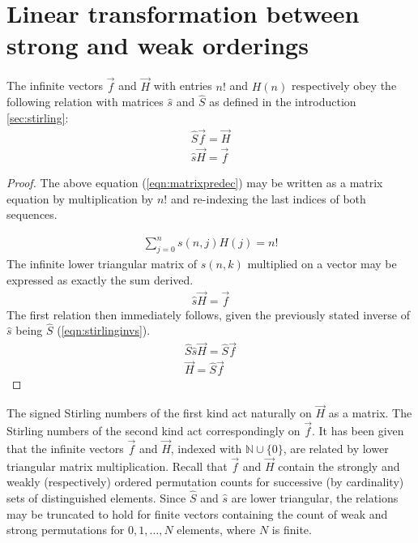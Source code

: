 \documentclass[12pt,reqno]{article}
\begin{document}
\section{Linear transformation between strong and weak orderings}

\begin{corollary}
	The infinite vectors $\vec{f}$ and $\vec{H}$ with entries $n!$ and $H(n)$ respectively obey the following relation with matrices $\hat{s}$ and $\hat{S}$ as defined in the introduction \ref{sec:stirling}:
	\begin{align}
		\hat{S}\vec{f} = \vec{H}\label{eqn:strongstirling} \\
		\hat{s}\vec{H} = \vec{f}
	\end{align}

	\begin{proof}
		The above equation (\ref{eqn:matrixpredec}) may be written as a matrix equation by multiplication by $n!$ and re-indexing the last indices of both sequences.

		\begin{align}
			\sum_{j = 0}^{n} s(n,j) H(j)  = n!
		\end{align}
		The infinite lower triangular matrix of $s(n,k)$ multiplied on a vector may be expressed as exactly the sum derived.
		\begin{align}
			\hat{s}\vec{H} = \vec{f} \nonumber
		\end{align}
		The first relation then immediately follows, given the previously stated inverse of $\hat{s}$ being $\hat{S}$ (\ref{eqn:stirlinginvs}).
		\begin{align}
			\hat{S}\hat{s}\vec{H} = \hat{S} \vec{f} \\
			\vec{H} = \hat{S} \vec{f} \nonumber
		\end{align}
	\end{proof}
\end{corollary}

The signed Stirling numbers of the first kind  act naturally on $\vec{H}$ as a matrix. The Stirling numbers of the second kind act correspondingly on $\vec{f}$. It has been given that the infinite vectors  $\vec{f}$ and $\vec{H}$, indexed with $\mathbb{N} \cup \{0\}$, are related by lower triangular matrix multiplication. Recall that $\vec{f}$ and $\vec{H}$ contain the strongly and weakly (respectively) ordered permutation counts for successive (by cardinality) sets of distinguished elements. Since $\hat{S}$ and $\hat{s}$ are lower triangular, the relations may be truncated to hold for finite vectors containing the count of weak and strong permutations for $0,1,\ldots, N$ elements, where $N$ is finite. 
\end{document}
